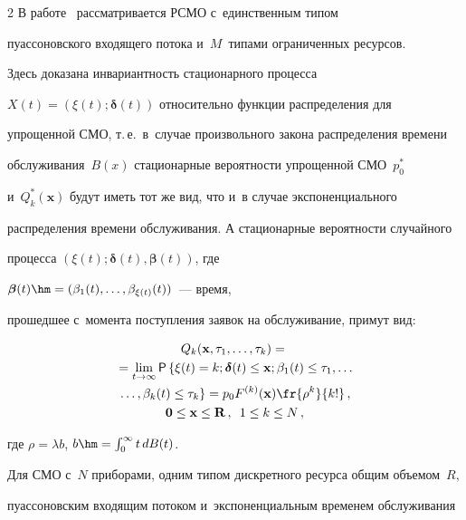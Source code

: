 \begin{multicols}{2}
В работе~\cite{Sopin_16_2018} рассматривается РСМО с~единственным типом 


пуассоновского входящего потока и~$M$~типами ограниченных ресурсов.


Здесь доказана инвариантность стационарного процесса 


$X(t)=(\xi(t);\boldsymbol{\delta}(t))$ относительно функции распределения для 


упрощенной СМО, т.\,е.\ в~случае произвольного закона распределения времени 


обслуживания~$B(x)$ стационарные вероятности упрощенной СМО~$p^{*}_0$ 


и~$Q^{*}_k(\mathbf{x})$ будут иметь тот же вид, что и~в случае экспоненциального 


распределения времени обслуживания. А стационарные вероятности случайного 


процесса $(\xi(t);\boldsymbol{\delta}(t), \boldsymbol{\beta}(t))$, где 


$\boldsymbol{\beta}(t)\hm=(\beta_1(t),\ldots,\beta_{\xi(t)}(t))$~--- время, 


прошедшее с~момента поступления заявок на обслуживание, примут вид:


\begin{multline*}


Q_k(\mathbf{x},\tau_1,\ldots,\tau_k)={}\\


{}=\lim_{t\rightarrow \infty} {\sf P} \left\{ 


\xi(t)=k;\boldsymbol{\delta}(t)\leq \mathbf{x}; \beta_1(t) \leq 


\tau_1,\ldots\right.\\


\left.\ldots,\beta_k(t) \leq \tau_k  \right\}=


p_0 F^{(k)}(\mathbf{x})\fr{\rho^{k}}{k!}\,, \\


\mathbf{0} \leq \mathbf{x} \leq \mathbf{R}\,, \enskip 1\leq k \leq N\,,


\end{multline*}


где $\rho=\lambda b$, $b\hm=\int\nolimits_{0}^{\infty}t\,dB(t)$.





Для СМО с~$N$ приборами, одним типом дискретного ресурса общим объемом~$R$, 


пуассоновским входящим потоком и~экспоненциальным временем обслуживания 



\end{multicols}
